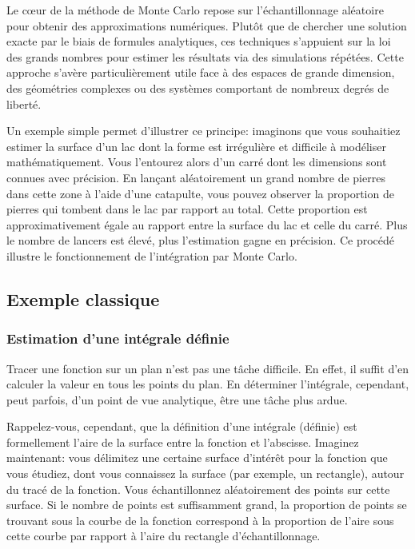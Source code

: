         Le cœur de la méthode de Monte Carlo repose sur l’échantillonnage aléatoire pour obtenir des approximations numériques. Plutôt que de chercher une solution exacte par le biais de formules analytiques, ces techniques s’appuient sur la loi des grands nombres pour estimer les résultats via des simulations répétées. Cette approche s’avère particulièrement utile face à des espaces de grande dimension, des géométries complexes ou des systèmes comportant de nombreux degrés de liberté.
        
        Un exemple simple permet d’illustrer ce principe: imaginons que vous souhaitiez estimer la surface d’un lac dont la forme est irrégulière et difficile à modéliser mathématiquement. Vous l’entourez alors d’un carré dont les dimensions sont connues avec précision. En lançant aléatoirement un grand nombre de pierres dans cette zone à l’aide d’une catapulte, vous pouvez observer la proportion de pierres qui tombent dans le lac par rapport au total. Cette proportion est approximativement égale au rapport entre la surface du lac et celle du carré. Plus le nombre de lancers est élevé, plus l’estimation gagne en précision. Ce procédé illustre le fonctionnement de l’intégration par Monte Carlo.
        
        \subsection{Exemple classique}
            \subsubsection{Estimation d'une intégrale définie}
                Tracer une fonction sur un plan n'est pas une tâche difficile. En effet, il suffit d'en calculer la valeur en tous les points du plan. En déterminer l'intégrale, cependant, peut parfois, d'un point de vue analytique, être une tâche plus ardue.
                
                Rappelez-vous, cependant, que la définition d'une intégrale (définie) est formellement l'aire de la surface entre la fonction et l'abscisse. Imaginez maintenant: vous délimitez une certaine surface d'intérêt pour la fonction que vous étudiez, dont vous connaissez la surface (par exemple, un rectangle), autour du tracé de la fonction. Vous échantillonnez aléatoirement des points sur cette surface. Si le nombre de points est suffisamment grand, la proportion de points se trouvant sous la courbe de la fonction correspond à la proportion de l'aire sous cette courbe par rapport à l'aire du rectangle d'échantillonnage. 

